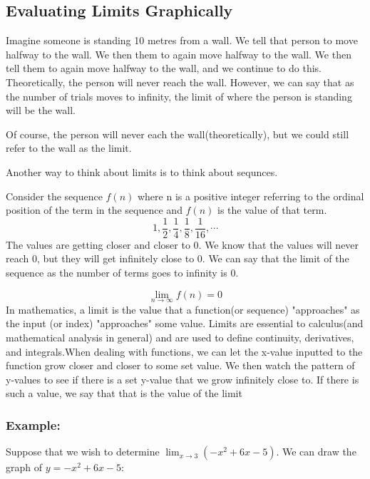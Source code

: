 \documentclass{article}
\begin{document}
\subsection{Evaluating Limits Graphically}
Imagine someone is standing 10 metres from a wall. We tell that person to move halfway to the wall. We then them to again move halfway to the wall. We then tell them to again move halfway to the wall, and we continue to do this. Theoretically, the person will never reach the wall. However, we can say that as the number of trials moves to infinity, the limit of where the person is standing will be the wall.

Of course, the person will never each the wall(theoretically), but we could still refer to the wall as the limit.

Another way to think about limits is to think about sequnces.

Consider the sequence $f(n)$ where n is a positive integer referring to the ordinal position of the term in the sequence and $f(n)$ is the value of that term.
$$1,\frac{1}{2},\frac{1}{4},\frac{1}{8},\frac{1}{16}, \cdots $$
The values are getting closer and closer to 0. We know that the values will never reach 0, but they will get infinitely close to 0. We can say that the limit of the sequence as the number of terms goes to infinity is 0.

$$\lim_{n \to \infty} f(n)=0$$
In mathematics, a limit is the value that a function(or sequence) "approaches" as the input (or index) "approaches" some value. Limits are essential to calculus(and mathematical analysis in general) and are used to define continuity, derivatives, and integrals.When dealing with functions, we can let the x-value inputted to the function grow closer and closer to some set value. We then watch the pattern of y-values to see if there is a set y-value that we grow infinitely close to. If there is such a value, we say that that is the value of the limit

\subsubsection{Example:}
Suppose that we wish to determine $\lim_{x \to 3} (-x^2+6x-5 )$. We can draw the graph of $y=-x^2+6x-5$:
\end{document}
